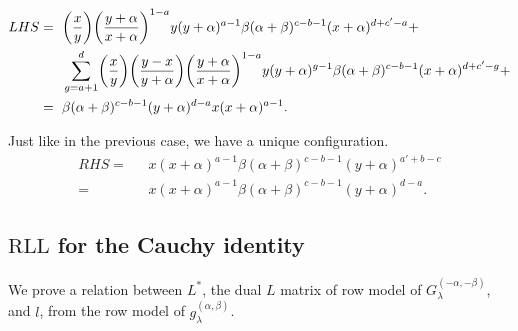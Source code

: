 \documentclass[ALCO, Unicode]{cedram}
\DeclarePairedDelimiter\autobracket{(}{)}
\newcommand{\br}[1]{\autobracket*{#1}}
\newcommand\g{{g^{(\alpha,\beta)}_{\lambda}}}
\begin{document}
{\allowdisplaybreaks
\begin{align*}
LHS=\text{ }& \br{\dfrac{x}{y}}\br{\dfrac{y+\alpha}{x+\alpha}}^{1-a}y(y+\alpha)^{a-1}\beta (\alpha+\beta)^{c-b-1}(x+\alpha)^{d+c'-a}+\\
            & \sum^{d}_{g=a+1}\br{\dfrac{x}{y}}\br{\dfrac{y-x}{y+\alpha}}\br{\dfrac{y+\alpha}{x+\alpha}}^{1-a}y(y+\alpha)^{g-1}\beta (\alpha+\beta)^{c-b-1}(x+\alpha)^{d+c'-g}+\\
            =\text{ }&\beta (\alpha+\beta)^{c-b-1}(y+\alpha)^{d-a}x(x+\alpha)^{a-1}.
\end{align*}
}

Just like in the previous case, we have a unique configuration.
\begin{align*}
RHS=\text{ }& x(x+\alpha)^{a-1} \beta (\alpha+\beta)^{c-b-1}(y+\alpha)^{a'+b-c}\\
  =\text{ }& x(x+\alpha)^{a-1} \beta (\alpha+\beta)^{c-b-1}(y+\alpha)^{d-a}.
\end{align*}

\subsection{\texorpdfstring{$\mathrm{RLL}$}{RLL} for the Cauchy identity}
\label{rllforcauchy}
We prove a relation between $L^*$, the dual $L$ matrix of row model of $G^{(-\alpha,-\beta)}_{\lambda}$, and $l$, from the row model of $\g$.
\end{document}
